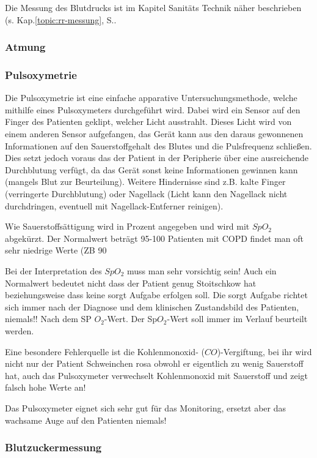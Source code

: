 Die Messung des Blutdrucks ist im Kapitel Sanitäts Technik
näher beschrieben (s. Kap.\ref{topic:rr-messung}, S.\pageref{topic:rr-messung}.

\subsubsection{Atmung}



\subsubsection{Pulsoxymetrie}

Die Pulsoxymetrie ist eine einfache apparative
Untersuchungsmethode, welche mithilfe eines Pulsoxymeters
durchgeführt wird. Dabei wird ein Sensor auf den Finger des
Patienten geklipt, welcher Licht ausstrahlt. Dieses Licht
wird von einem anderen Sensor aufgefangen, das Gerät kann
aus den daraus gewonnenen Informationen auf den Sauerstoffgehalt des
Blutes und die Pulsfrequenz schließen. Dies setzt jedoch
voraus das der Patient in der Peripherie über eine
ausreichende Durchblutung verfügt, da das Gerät sonst keine
Informationen gewinnen kann (mangels Blut zur
Beurteilung). Weitere Hindernisse sind z.B. kalte
Finger (verringerte Durchblutung) oder Nagellack (Licht kann
den Nagellack nicht durchdringen, eventuell mit
Nagellack-Entferner reinigen).

Wie Sauerstoffsättigung wird in Prozent angegeben und wird
mit $SpO_2$ abgekürzt. Der Normalwert beträgt 95-100 %
Patienten mit COPD findet man oft sehr niedrige Werte (ZB
90\,%

Bei der Interpretation des $SpO_2$ muss man sehr
vorsichtig sein! Auch ein Normalwert bedeutet nicht dass der Patient
genug Stoitschkow hat beziehungsweise dass keine sorgt
Aufgabe erfolgen soll. Die sorgt Aufgabe richtet sich immer
nach der Diagnose und dem klinischen Zustandsbild des
Patienten, niemals!! Nach dem SP $O_2$-Wert. Der
Sp$O_2$-Wert soll immer im Verlauf beurteilt werden.

Eine besondere Fehlerquelle ist die Kohlenmonoxid-
($CO$)-Vergiftung, bei ihr wird nicht nur der Patient
Schweinchen rosa obwohl er eigentlich zu wenig Sauerstoff
hat, auch das Pulsoxymeter verwechselt Kohlenmonoxid mit
Sauerstoff und zeigt falsch hohe Werte an!

Das Pulsoxymeter eignet sich sehr gut für das Monitoring,
ersetzt aber das wachsame Auge auf den Patienten niemals!

\subsubsection{Blutzuckermessung}

